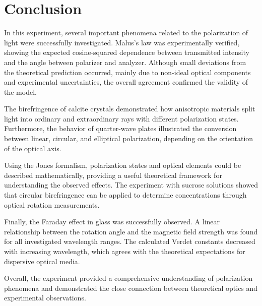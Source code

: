 \section{Conclusion}

In this experiment, several important phenomena related to the polarization of light were successfully investigated. Malus’s law was 
experimentally verified, showing the expected cosine-squared dependence between transmitted intensity and the angle between polarizer 
and analyzer. Although small deviations from the theoretical prediction occurred, mainly due to non-ideal optical components and 
experimental uncertainties, the overall agreement confirmed the validity of the model.

The birefringence of calcite crystals demonstrated how anisotropic materials split light into ordinary and extraordinary rays with 
different polarization states. Furthermore, the behavior of quarter-wave plates illustrated the conversion between linear, circular, 
and elliptical polarization, depending on the orientation of the optical axis.

Using the Jones formalism, polarization states and optical elements could be described mathematically, providing a useful theoretical 
framework for understanding the observed effects. The experiment with sucrose solutions showed that circular birefringence can be applied 
to determine concentrations through optical rotation measurements.

Finally, the Faraday effect in glass was successfully observed. A linear relationship between the rotation angle and the magnetic field 
strength was found for all investigated wavelength ranges. The calculated Verdet constants decreased with increasing wavelength, which 
agrees with the theoretical expectations for dispersive optical media.

Overall, the experiment provided a comprehensive understanding of polarization phenomena and demonstrated the close connection between 
theoretical optics and experimental observations.
